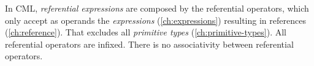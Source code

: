 In CML, \emph{referential expressions} are composed by the referential operators,
which only accept as operands the \emph{expressions} (\ref{ch:expressions})
resulting in references (\ref{ch:reference}).
That excludes all \emph{primitive types} (\ref{ch:primitive-types}).
All referential operators are infixed.
There is no associativity between referential operators.
